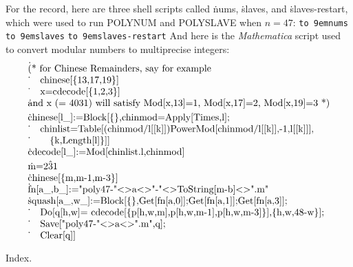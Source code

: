 For the record, here are three shell scripts called \.{nums},
\.{slaves}, and \.{slaves-restart}, which were used to
run {\mc POLYNUM} and {\mc POLYSLAVE} when $n=47$:
\bigskip
\hbox{\qquad\tt\hbox to 9em{nums\hfil}}
\bigskip
\hbox{\qquad\tt\hbox to 9em{slaves\hfil}}
\bigskip
\hbox{\qquad\tt\hbox to 9em{slaves-restart\hfil}}
\bigskip
And here is the {\it Mathematica\/} script used to convert modular numbers
to multiprecise integers:
$$
\vbox{\halign{\.{#}\hfil\cr
(* for Chinese Remainders, say for example\cr
\quad   chinese[\{13,17,19\}]\cr
\quad   x=cdecode[\{1,2,3\}]\cr
and x (= 4031) will satisfy Mod[x,13]=1, Mod[x,17]=2, Mod[x,19]=3 *)\cr
\noalign{\smallskip}
chinese[l\_]:=Block[\{\},chinmod=Apply[Times,l];\cr
\quad chinlist=Table[(chinmod/l[[k]])PowerMod[chinmod/l[[k]],-1,l[[k]]],\cr
\qquad \{k,Length[l]\}]]\cr
cdecode[l\_]:=Mod[chinlist.l,chinmod]\cr
\noalign{\smallskip}
m=2\^31\cr
chinese[\{m,m-1,m-3\}]\cr
fn[a\_,b\_]:="poly47-"<>a<>"-"<>ToString[m-b]<>".m"\cr
squash[a\_,w\_]:=Block[\{\},Get[fn[a,0]];Get[fn[a,1]];Get[fn[a,3]];\cr
\quad Do[q[h,w]= cdecode[\{p[h,w,m],p[h,w,m-1],p[h,w,m-3]\}],\{h,w,48-w\}];\cr
\quad Save["poly47-"<>a<>".m",q];\cr
\quad Clear[q]]\cr
}}$$


\fi

Index.
\fi

\inx
\fin
\con
